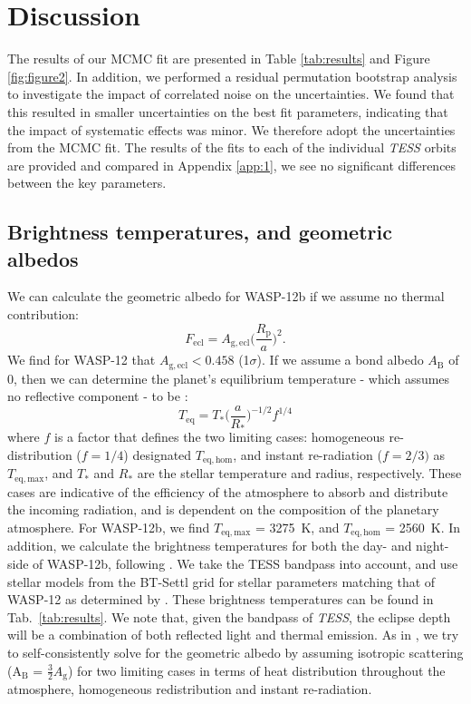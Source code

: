 \documentclass[fleqn,usenatbib]{mnras}
\begin{document}
\section{Discussion}\label{discussion}

The results of our MCMC  fit are presented in Table \ref{tab:results} and Figure \ref{fig:figure2}. In addition, we performed a residual permutation bootstrap analysis to investigate the impact of correlated noise on the uncertainties. We found that this resulted in smaller uncertainties on the best fit parameters, indicating that the impact of systematic effects was minor. We therefore adopt the uncertainties from the MCMC fit. The results of the fits to each of the individual \textit{TESS} orbits are provided and compared in Appendix \ref{app:1}, we see no significant differences between the key parameters.

\subsection{Brightness temperatures, and geometric albedos}
We can calculate the geometric albedo for WASP-12b if we assume no thermal contribution:
\begin{equation}
    F_{\mathrm{ecl}} = A_{\mathrm{g, ecl}}\bigg(\frac{R_{\mathrm{p}}}{a}\bigg)^{2}.
\end{equation}
We find for WASP-12 that $A_{\mathrm{g,ecl}}<0.458$ (1$\sigma$).
If we assume a bond albedo $A_{\mathrm{B}}$ of 0, then we can determine the planet's equilibrium temperature - which assumes no reflective component - to be \citep{seager}:
\begin{equation}
    T_{\mathrm{eq}} = T_{*}\bigg(\frac{a}{R_{*}}\bigg)^{-1/2}f^{1/4}
\end{equation}
where $f$ is a factor that defines the two limiting cases: homogeneous re-distribution ($f=1/4$) designated $T_{\mathrm{eq,hom}}$, and instant re-radiation ($f=2/3)$ as $T_{\mathrm{eq,max}}$, and $T_{*}$ and $R_{*}$ are the stellar temperature and radius, respectively. These cases are indicative of the efficiency of the atmosphere to absorb and distribute the incoming radiation, and is dependent on the composition of the planetary atmosphere. For WASP-12b, we find $T_{\mathrm{eq,max}}$ = 3275~K, and $T_{\mathrm{eq,hom}}$ = 2560~K. In addition, we calculate the brightness temperatures for both the day- and night-side of WASP-12b, following \cite{esteves2013}. We take the TESS bandpass into account, and use stellar models from the BT-Settl grid \citep{allard} for stellar parameters matching that of WASP-12 as determined by \citet{stellarparams}. These brightness temperatures can be found in Tab.~\ref{tab:results}. We note that, given the bandpass of \textit{TESS}, the eclipse depth will be a combination of both reflected light and thermal emission. As in \cite{esteves2013}, we try to self-consistently solve for the geometric albedo by assuming isotropic scattering (A$_{\mathrm{B}}$ = $\frac{3}{2}A_{\mathrm{g}}$) for two limiting cases in terms of heat distribution throughout the atmosphere, homogeneous redistribution and instant re-radiation.
\end{document}
